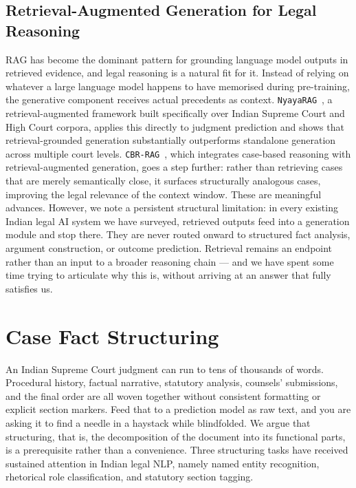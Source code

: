 \subsection{Retrieval-Augmented Generation for Legal Reasoning}

RAG has become the dominant pattern for grounding language model outputs in retrieved evidence, and legal reasoning is a natural fit for it. Instead of relying on whatever a large language model happens to have memorised during pre-training, the generative component receives actual precedents as context. \texttt{NyayaRAG}~\cite{nigam-etal-2025-nyayarag}, a retrieval-augmented framework built specifically over Indian Supreme Court and High Court corpora, applies this directly to judgment prediction and shows that retrieval-grounded generation substantially outperforms standalone generation across multiple court levels. \texttt{CBR-RAG}~\cite{wiratunga-etal-2024-cbrrag}, which integrates case-based reasoning with retrieval-augmented generation, goes a step further: rather than retrieving cases that are merely semantically close, it surfaces structurally analogous cases, improving the legal relevance of the context window. These are meaningful advances. However, we note a persistent structural limitation: in every existing Indian legal AI system we have surveyed, retrieved outputs feed into a generation module and stop there. They are never routed onward to structured fact analysis, argument construction, or outcome prediction. Retrieval remains an endpoint rather than an input to a broader reasoning chain — and we have spent some time trying to articulate why this is, without arriving at an answer that fully satisfies us.

\section{Case Fact Structuring}

An Indian Supreme Court judgment can run to tens of thousands of words. Procedural history, factual narrative, statutory analysis, counsels' submissions, and the final order are all woven together without consistent formatting or explicit section markers. Feed that to a prediction model as raw text, and you are asking it to find a needle in a haystack while blindfolded. We argue that structuring, that is, the decomposition of the document into its functional parts, is a prerequisite rather than a convenience. Three structuring tasks have received sustained attention in Indian legal NLP, namely named entity recognition, rhetorical role classification, and statutory section tagging.

